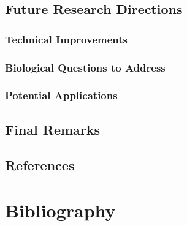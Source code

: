 \documentclass[
  11pt,
  a4paper,
]{report}
\begin{document}
\section{Future Research Directions}\label{future-research-directions-1}

\subsection{Technical Improvements}\label{technical-improvements-1}

\subsection{Biological Questions to
Address}\label{biological-questions-to-address}

\subsection{Potential Applications}\label{potential-applications-1}

\section{Final Remarks}\label{final-remarks}

\section{References}\label{references}

\clearpage
\captionsetup[figure]{list=false}
\captionsetup[table]{list=false}


\chapter*{Bibliography}\label{bibliography}

\end{document}
